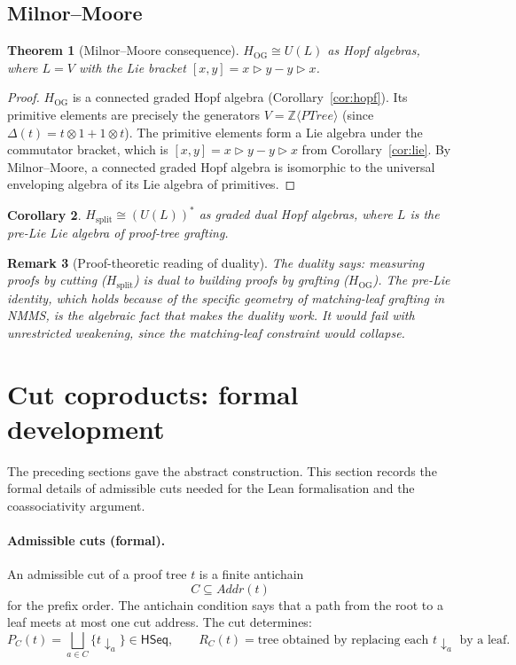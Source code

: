 \documentclass[11pt]{article}
\newtheorem{theorem}{Theorem}
\newtheorem{corollary}[theorem]{Corollary}
\newtheorem{remark}[theorem]{Remark}
\newcommand{\PTree}{\mathit{PTree}}
\newcommand{\Addr}{\mathit{Addr}}
\newcommand{\ZZ}{\mathbb{Z}}
\begin{document}
\subsection{Milnor--Moore}

\begin{theorem}[Milnor--Moore consequence]\label{thm:milnormoore}
$H_{\mathrm{OG}}\cong U(L)$ as Hopf algebras, where $L=V$ with the Lie bracket $[x,y]=x\triangleright y - y\triangleright x$.
\end{theorem}

\begin{proof}
$H_{\mathrm{OG}}$ is a connected graded Hopf algebra (Corollary~\ref{cor:hopf}).  Its primitive elements are precisely the generators $V=\ZZ\langle\PTree\rangle$ (since $\Delta(t)=t\otimes 1+1\otimes t$).  The primitive elements form a Lie algebra under the commutator bracket, which is $[x,y]=x\triangleright y-y\triangleright x$ from Corollary~\ref{cor:lie}.  By Milnor--Moore, a connected graded Hopf algebra is isomorphic to the universal enveloping algebra of its Lie algebra of primitives.
\end{proof}

\begin{corollary}
$H_{\mathrm{split}}\cong (U(L))^*$ as graded dual Hopf algebras, where $L$ is the pre-Lie Lie algebra of proof-tree grafting.
\end{corollary}

\begin{remark}[Proof-theoretic reading of duality]
The duality says: \emph{measuring proofs by cutting} ($H_{\mathrm{split}}$) is dual to \emph{building proofs by grafting} ($H_{\mathrm{OG}}$).  The pre-Lie identity, which holds because of the specific geometry of matching-leaf grafting in NMMS, is the algebraic fact that makes the duality work.  It would fail with unrestricted weakening, since the matching-leaf constraint would collapse.
\end{remark}

\section{Cut coproducts: formal development}\label{sec:cut-formal}

The preceding sections gave the abstract construction.  This section records the formal details of admissible cuts needed for the Lean formalisation and the coassociativity argument.

\paragraph{Admissible cuts (formal).}
An admissible cut of a proof tree \(t\) is a finite antichain
\[
C\subseteq\Addr(t)
\]
for the prefix order.  The antichain condition says that a path from the root
to a leaf meets at most one cut address.  The cut determines:
\[
P_C(t)=\bigsqcup_{a\in C}\{t\!\downarrow_a\}\in\mathsf{HSeq},
\qquad
R_C(t)=\text{tree obtained by replacing each }t\!\downarrow_a\text{ by a leaf.}
\]
\end{document}
